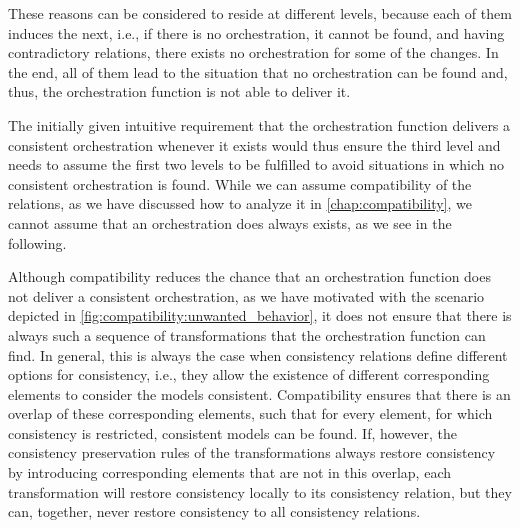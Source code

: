 These reasons can be considered to reside at different levels, because each of them induces the next, i.e., if there is no orchestration, it cannot be found, and having contradictory relations, there exists no orchestration for some of the changes.
In the end, all of them lead to the situation that no orchestration can be found and, thus, the orchestration function is not able to deliver it.

The initially given intuitive requirement that the orchestration function delivers a consistent orchestration whenever it exists would thus ensure the third level and needs to assume the first two levels to be fulfilled to avoid situations in which no consistent orchestration is found.
While we can assume compatibility of the relations, as we have discussed how to analyze it in \autoref{chap:compatibility}, we cannot assume that an orchestration does always exists, as we see in the following.

Although compatibility reduces the chance that an orchestration function does not deliver a consistent orchestration, as we have motivated with the scenario depicted in \autoref{fig:compatibility:unwanted_behavior}, it does not ensure that there is always such a sequence of transformations that the orchestration function can find.
In general, this is always the case when consistency relations define different options for consistency, i.e., they allow the existence of different corresponding elements to consider the models consistent.
Compatibility ensures that there is an overlap of these corresponding elements, such that for every element, for which consistency is restricted, consistent models can be found.
If, however, the consistency preservation rules of the transformations always restore consistency by introducing corresponding elements that are not in this overlap, each transformation will restore consistency locally to its consistency relation, but they can, together, never restore consistency to all consistency relations.

